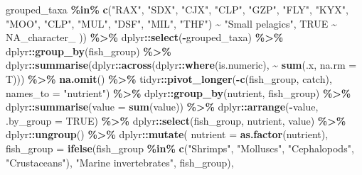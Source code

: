 \documentclass[
]{book}
\newenvironment{Shaded}{\begin{snugshade}}{\end{snugshade}}
\newcommand{\AttributeTok}[1]{\textcolor[rgb]{0.13,0.29,0.53}{#1}}
\newcommand{\ConstantTok}[1]{\textcolor[rgb]{0.56,0.35,0.01}{#1}}
\newcommand{\FunctionTok}[1]{\textcolor[rgb]{0.13,0.29,0.53}{\textbf{#1}}}
\newcommand{\NormalTok}[1]{#1}
\newcommand{\SpecialCharTok}[1]{\textcolor[rgb]{0.81,0.36,0.00}{\textbf{#1}}}
\newcommand{\StringTok}[1]{\textcolor[rgb]{0.31,0.60,0.02}{#1}}
\begin{document}
\begin{Shaded}
\begin{Highlighting}[]
\NormalTok{    grouped\_taxa }\SpecialCharTok{\%in\%} \FunctionTok{c}\NormalTok{(}\StringTok{"RAX"}\NormalTok{, }\StringTok{"SDX"}\NormalTok{, }\StringTok{"CJX"}\NormalTok{, }\StringTok{"CLP"}\NormalTok{, }\StringTok{"GZP"}\NormalTok{, }\StringTok{"FLY"}\NormalTok{, }\StringTok{"KYX"}\NormalTok{, }\StringTok{"MOO"}\NormalTok{, }\StringTok{"CLP"}\NormalTok{, }\StringTok{"MUL"}\NormalTok{, }\StringTok{"DSF"}\NormalTok{, }\StringTok{"MIL"}\NormalTok{, }\StringTok{"THF"}\NormalTok{) }\SpecialCharTok{\textasciitilde{}} \StringTok{"Small pelagics"}\NormalTok{,}
    \ConstantTok{TRUE} \SpecialCharTok{\textasciitilde{}} \ConstantTok{NA\_character\_}
\NormalTok{  )) }\SpecialCharTok{\%\textgreater{}\%}
\NormalTok{  dplyr}\SpecialCharTok{::}\FunctionTok{select}\NormalTok{(}\SpecialCharTok{{-}}\NormalTok{grouped\_taxa) }\SpecialCharTok{\%\textgreater{}\%}
\NormalTok{  dplyr}\SpecialCharTok{::}\FunctionTok{group\_by}\NormalTok{(fish\_group) }\SpecialCharTok{\%\textgreater{}\%}
\NormalTok{  dplyr}\SpecialCharTok{::}\FunctionTok{summarise}\NormalTok{(dplyr}\SpecialCharTok{::}\FunctionTok{across}\NormalTok{(dplyr}\SpecialCharTok{::}\FunctionTok{where}\NormalTok{(is.numeric), }\SpecialCharTok{\textasciitilde{}} \FunctionTok{sum}\NormalTok{(.x, }\AttributeTok{na.rm =}\NormalTok{ T))) }\SpecialCharTok{\%\textgreater{}\%}
  \FunctionTok{na.omit}\NormalTok{() }\SpecialCharTok{\%\textgreater{}\%}
\NormalTok{  tidyr}\SpecialCharTok{::}\FunctionTok{pivot\_longer}\NormalTok{(}\SpecialCharTok{{-}}\FunctionTok{c}\NormalTok{(fish\_group, catch), }\AttributeTok{names\_to =} \StringTok{"nutrient"}\NormalTok{) }\SpecialCharTok{\%\textgreater{}\%}
\NormalTok{  dplyr}\SpecialCharTok{::}\FunctionTok{group\_by}\NormalTok{(nutrient, fish\_group) }\SpecialCharTok{\%\textgreater{}\%}
\NormalTok{  dplyr}\SpecialCharTok{::}\FunctionTok{summarise}\NormalTok{(}\AttributeTok{value =} \FunctionTok{sum}\NormalTok{(value)) }\SpecialCharTok{\%\textgreater{}\%}
\NormalTok{  dplyr}\SpecialCharTok{::}\FunctionTok{arrange}\NormalTok{(}\SpecialCharTok{{-}}\NormalTok{value, }\AttributeTok{.by\_group =} \ConstantTok{TRUE}\NormalTok{) }\SpecialCharTok{\%\textgreater{}\%}
\NormalTok{  dplyr}\SpecialCharTok{::}\FunctionTok{select}\NormalTok{(fish\_group, nutrient, value) }\SpecialCharTok{\%\textgreater{}\%}
\NormalTok{  dplyr}\SpecialCharTok{::}\FunctionTok{ungroup}\NormalTok{() }\SpecialCharTok{\%\textgreater{}\%}
\NormalTok{  dplyr}\SpecialCharTok{::}\FunctionTok{mutate}\NormalTok{(}
    \AttributeTok{nutrient =} \FunctionTok{as.factor}\NormalTok{(nutrient),}
    \AttributeTok{fish\_group =} \FunctionTok{ifelse}\NormalTok{(fish\_group }\SpecialCharTok{\%in\%} \FunctionTok{c}\NormalTok{(}\StringTok{"Shrimps"}\NormalTok{, }\StringTok{"Molluscs"}\NormalTok{, }\StringTok{"Cephalopods"}\NormalTok{, }\StringTok{"Crustaceans"}\NormalTok{), }\StringTok{"Marine invertebrates"}\NormalTok{, fish\_group),}

\end{Highlighting}
\end{Shaded}
\end{document}
